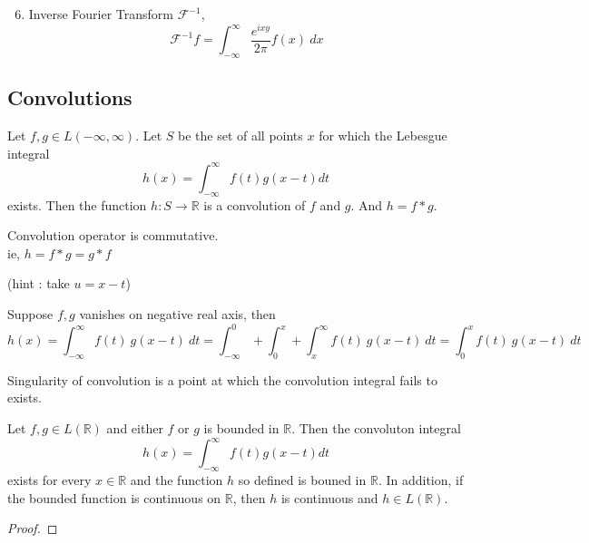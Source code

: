 \begin{enumerate}
	\setcounter{enumi}{5}
	\item Inverse Fourier Transform $\mathscr{F}^{-1}$,
		\[ \mathscr{F}^{-1}f = \int_{-\infty}^\infty \frac{e^{ixy}}{2\pi}f(x)\ dx \]
\end{enumerate}

\subsection{Convolutions}
\begin{definition}
	Let \( f,g \in L(-\infty,\infty) \).
	Let $S$ be the set of all points $x$ for which the Lebesgue integral
	\[ h(x) = \int_{-\infty}^\infty f(t) g(x-t) dt \]
	exists.
	Then the function \( h : S \to \mathbb{R} \) is a convolution of $f$ and $g$.
	And \( h = f \ast g \).
\end{definition}

\begin{remark}
	Convolution operator is commutative.\\
	ie, \( h = f \ast g = g \ast f \)
	\begin{commentary}
		(hint : take $u = x-t$)
	\end{commentary}
\end{remark}

\begin{remark}
	Suppose $f,g$ vanishes on negative real axis, then
	\[ h(x) = \int_{-\infty}^\infty f(t)\ g(x-t)\ dt = \int_{-\infty}^0 + \int_0^x  + \int_x^\infty f(t)\ g(x-t)\ dt = \int_0^x f(t)\ g(x-t)\ dt \] 
\end{remark}

\begin{remark}
	Singularity of convolution is a point at which the convolution integral fails to exists.
\end{remark}

\begin{theorem}
	Let \( f,g \in L(\mathbb{R}) \) and either $f$ or $g$ is bounded in $\mathbb{R}$.
	Then the convoluton integral
	\[ h(x) = \int_{-\infty}^\infty f(t) g(x-t) dt \]
	exists for every \( x \in \mathbb{R} \) and the function $h$ so defined is bouned in $\mathbb{R}$.
	In addition, if the bounded function is continuous on $\mathbb{R}$, then $h$ is continuous and \( h \in L(\mathbb{R}) \).
\end{theorem}
\begin{synopsis}
\end{synopsis}
\begin{proof}
\end{proof}

